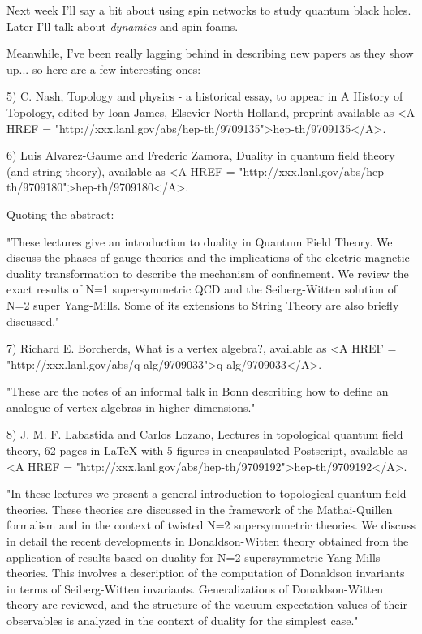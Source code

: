Next week I'll say a bit about using spin networks to study quantum
black holes.  Later I'll talk about \emph{dynamics} and spin foams.

Meanwhile, I've been really lagging behind in describing new papers as
they show up... so here are a few interesting ones:

5) C. Nash, Topology and physics - a historical essay, to appear in 
A History of Topology, edited by Ioan James, Elsevier-North Holland, 
preprint available as <A HREF = "http://xxx.lanl.gov/abs/hep-th/9709135">hep-th/9709135</A>.  

6) Luis Alvarez-Gaume and Frederic Zamora, Duality in quantum field
theory (and string theory), available as <A HREF = "http://xxx.lanl.gov/abs/hep-th/9709180">hep-th/9709180</A>.

Quoting the abstract: 

"These lectures give an introduction to duality in Quantum Field Theory. We
discuss the phases of gauge theories and the implications of the
electric-magnetic duality transformation to describe the mechanism of
confinement. We review the exact results of N=1 supersymmetric QCD and the
Seiberg-Witten solution of N=2 super Yang-Mills. Some of its extensions to
String Theory are also briefly discussed."

7) Richard E. Borcherds, What is a vertex algebra?, available as
<A HREF = "http://xxx.lanl.gov/abs/q-alg/9709033">q-alg/9709033</A>.

"These are the notes of an informal talk in Bonn describing how to
define an analogue of vertex algebras in higher dimensions."

8) J. M. F. Labastida and Carlos Lozano, Lectures in topological quantum
field theory, 62 pages in LaTeX with 5 figures in encapsulated
Postscript, available as <A HREF = "http://xxx.lanl.gov/abs/hep-th/9709192">hep-th/9709192</A>.

"In these lectures we present a general introduction to topological
quantum field theories. These theories are discussed in the framework of
the Mathai-Quillen formalism and in the context of twisted N=2
supersymmetric theories. We discuss in detail the recent developments in
Donaldson-Witten theory obtained from the application of results based
on duality for N=2 supersymmetric Yang-Mills theories. This involves a
description of the computation of Donaldson invariants in terms of
Seiberg-Witten invariants.  Generalizations of Donaldson-Witten theory
are reviewed, and the structure of the vacuum expectation values of
their observables is analyzed in the context of duality for the simplest
case."

